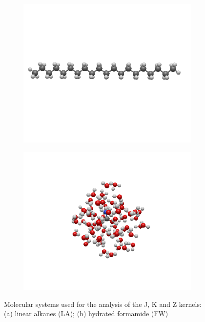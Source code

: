 \begin{figure}
     \centering
     \begin{subfigure}{0.4\textwidth}
         \centering
         \includegraphics[width=\textwidth]{Pics/alkan.png}
         \caption{}
     \end{subfigure}
	\begin{subfigure}{0.5\textwidth}
         \centering
         \includegraphics[width=\textwidth]{Pics/FW63.png}
         \caption{}
         \label{fig:five over x}
     \end{subfigure}
     	\caption{Molecular systems used for the analysis of the J, K and Z kernels: (a) linear alkanes (LA); (b) hydrated formamide (FW)}
        \label{fig:GS_MOL}
\end{figure}

